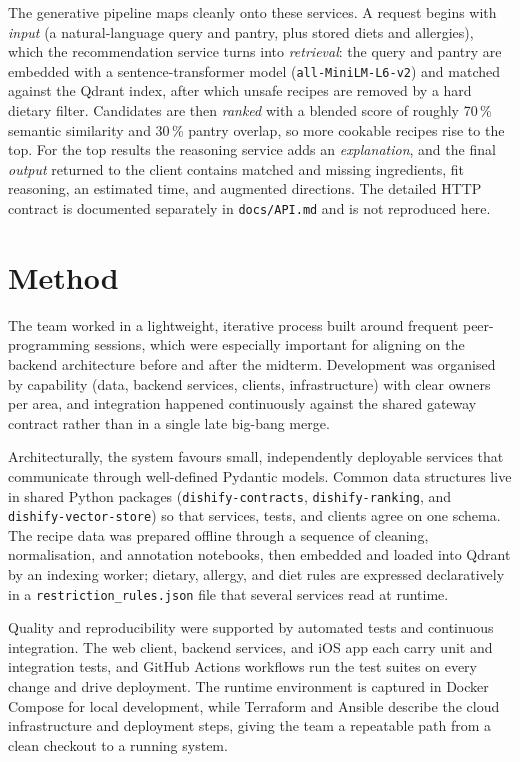 The generative pipeline maps cleanly onto these services. A request begins with
\emph{input} (a natural-language query and pantry, plus stored diets and
allergies), which the recommendation service turns into \emph{retrieval}: the
query and pantry are embedded with a sentence-transformer model
(\texttt{all-MiniLM-L6-v2}) and matched against the Qdrant index, after which
unsafe recipes are removed by a hard dietary filter. Candidates are then
\emph{ranked} with a blended score of roughly 70\,\% semantic similarity and
30\,\% pantry overlap, so more cookable recipes rise to the top. For the top
results the reasoning service adds an \emph{explanation}, and the final
\emph{output} returned to the client contains matched and missing ingredients,
fit reasoning, an estimated time, and augmented directions. The detailed HTTP
contract is documented separately in \texttt{docs/API.md} and is not reproduced
here.

\section{Method}

The team worked in a lightweight, iterative process built around frequent
peer-programming sessions, which were especially important for aligning on the
backend architecture before and after the midterm. Development was organised by
capability (data, backend services, clients, infrastructure) with clear owners
per area, and integration happened continuously against the shared gateway
contract rather than in a single late big-bang merge.

Architecturally, the system favours small, independently deployable services that
communicate through well-defined Pydantic models. Common data structures live in
shared Python packages (\texttt{dishify-contracts}, \texttt{dishify-ranking},
and \texttt{dishify-vector-store}) so that services, tests, and clients agree on
one schema. The recipe data was prepared offline through a sequence of cleaning,
normalisation, and annotation notebooks, then embedded and loaded into Qdrant by
an indexing worker; dietary, allergy, and diet rules are expressed declaratively
in a \texttt{restriction\_rules.json} file that several services read at runtime.

Quality and reproducibility were supported by automated tests and continuous
integration. The web client, backend services, and iOS app each carry unit and
integration tests, and GitHub Actions workflows run the test suites on every
change and drive deployment. The runtime environment is captured in Docker
Compose for local development, while Terraform and Ansible describe the cloud
infrastructure and deployment steps, giving the team a repeatable path from a
clean checkout to a running system.


